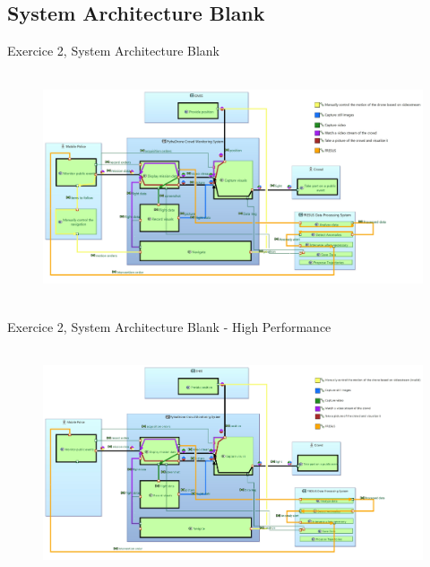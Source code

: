 \documentclass[aspectratio=1610]{beamer}
\begin{document}
    \subsection{System Architecture Blank}
    \begin{frame}{Exercice 2, System Architecture Blank}
        \begin{figure}[H]
            \centering
            \includegraphics[width=\textwidth, height=6.75cm, keepaspectratio]{./images/EX2/CSC_5RO08_TA_EX2_SAB.jpg}
        \end{figure}
    \end{frame}
    \begin{frame}{Exercice 2, System Architecture Blank - High Performance}
        \begin{figure}[H]
            \centering
            \includegraphics[width=\textwidth, height=6.75cm, keepaspectratio]{./images/EX2/CSC_5RO08_TA_EX2_SAB_High.jpg}
        \end{figure}
    \end{frame}
\end{document}
